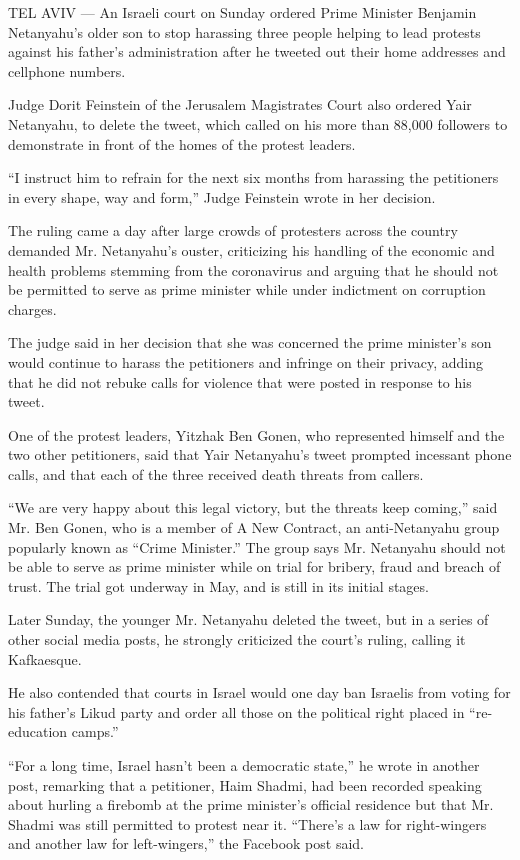 TEL AVIV --- An Israeli court on Sunday ordered Prime Minister Benjamin
Netanyahu's older son to stop harassing three people helping to lead
protests against his father's administration after he tweeted out their
home addresses and cellphone numbers.

Judge Dorit Feinstein of the Jerusalem Magistrates Court also ordered
Yair Netanyahu, to delete the tweet, which called on his more than
88,000 followers to demonstrate in front of the homes of the protest
leaders.

``I instruct him to refrain for the next six months from harassing the
petitioners in every shape, way and form,'' Judge Feinstein wrote in her
decision.

The ruling came a day after large crowds of protesters across the
country demanded Mr. Netanyahu's ouster, criticizing his handling of the
economic and health problems stemming from the coronavirus and arguing
that he should not be permitted to serve as prime minister while under
indictment on corruption charges.

The judge said in her decision that she was concerned the prime
minister's son would continue to harass the petitioners and infringe on
their privacy, adding that he did not rebuke calls for violence that
were posted in response to his tweet.

One of the protest leaders, Yitzhak Ben Gonen, who represented himself
and the two other petitioners, said that Yair Netanyahu's tweet prompted
incessant phone calls, and that each of the three received death threats
from callers.

``We are very happy about this legal victory, but the threats keep
coming,'' said Mr. Ben Gonen, who is a member of A New Contract, an
anti-Netanyahu group popularly known as ``Crime Minister.'' The group
says Mr. Netanyahu should not be able to serve as prime minister while
on trial for bribery, fraud and breach of trust. The trial got underway
in May, and is still in its initial stages.

Later Sunday, the younger Mr. Netanyahu deleted the tweet, but in a
series of other social media posts, he strongly criticized the court's
ruling, calling it Kafkaesque.

He also contended that courts in Israel would one day ban Israelis from
voting for his father's Likud party and order all those on the political
right placed in ``re-education camps.''

``For a long time, Israel hasn't been a democratic state,'' he wrote in
another post, remarking that a petitioner, Haim Shadmi, had been
recorded speaking about hurling a firebomb at the prime minister's
official residence but that Mr. Shadmi was still permitted to protest
near it. ``There's a law for right-wingers and another law for
left-wingers,'' the Facebook post said.

